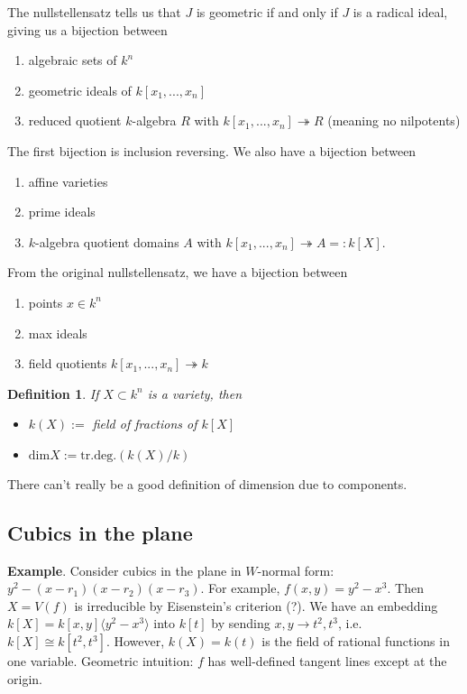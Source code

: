 \documentclass[letterpaper, 12pt]{article}
\newtheorem{definition}[thm]{Definition}
\renewcommand{\dim}{\mathrm{dim}}
\newcommand{\iso}{\cong}
\newcommand{\polyring}[3]{#1[x_{#2}, ..., x_{#3}]}
\begin{document}
The nullstellensatz tells us that $J$ is geometric if and only if $J$ is a
radical ideal, giving us a bijection between \begin{enumerate} \item algebraic
sets of $k^n$ \item geometric ideals of $\polyring k 1 n$ \item reduced
quotient $k$-algebra $R$ with $\polyring k 1 n \twoheadrightarrow R$ (meaning
no nilpotents) \end{enumerate}

The first bijection is inclusion reversing.  We also have a bijection between
\begin{enumerate}
\item affine varieties
\item prime ideals
\item $k$-algebra quotient domains $A$ with $\polyring k 1 n \twoheadrightarrow A =: k[X]$.
\end{enumerate}

From the original nullstellensatz, we have a bijection between
\begin{enumerate}
\item points $x \in k^n$
\item max ideals
\item field quotients $\polyring k 1 n \twoheadrightarrow k$
\end{enumerate}

\begin{definition}
If $X \subset k^n$ is a variety, then
  \begin{itemize}
    \item $k(X) :=$ field of fractions of $k[X]$
    \item $\dim X := \mathrm{tr. deg.} (k(X)/k)$
  \end{itemize}
\end{definition}

There can't really be a good definition of dimension due to components.

\subsection{Cubics in the plane}

\textbf{Example}. Consider cubics in the plane in $W$-normal form: $y^2 - (x -
r_1)(x - r_2)(x - r_3)$. For example, $f(x,y) = y^2 - x^3$. Then $X = V(f)$
is irreducible by Eisenstein's criterion (?). We have an embedding $k[X] =
k[x,y] \langle y^2 - x^3 \rangle$ into $k[t]$ by sending $x, y \rightarrow t^2,
t^3$, i.e. $k[X] \iso k[t^2, t^3]$. However, $k(X) = k(t)$ is the field of
rational functions in one variable. Geometric intuition: $f$ has well-defined
tangent lines except at the origin.
\end{document}
